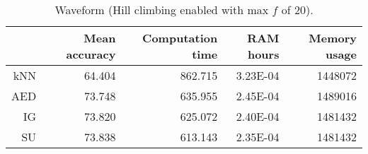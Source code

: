 \begin{table}[h]
\centering
\begin{tabular}{r|rrrr}
    & Mean accuracy  & Computation time & RAM hours & Memory usage \\ \hline
kNN & 64.404                   & 862.715          & 3.23E-04  & 1448072      \\
AED & 73.748                   & 635.955          & 2.45E-04  & 1489016      \\
IG  & 73.820                   & 625.072          & 2.40E-04  & 1481432      \\
SU  & 73.838                   & 613.143          & 2.35E-04  & 1481432     
\end{tabular}
\caption{Waveform (Hill climbing enabled with max $f$ of 20).}
\label{Table:Waveform_H}
\end{table}